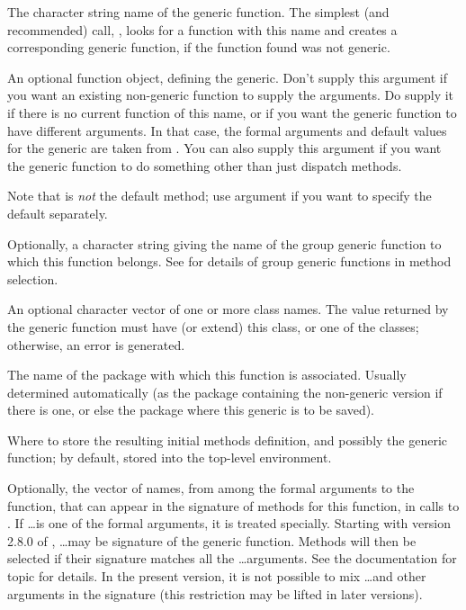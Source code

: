 \begin{Arguments}
\begin{ldescription}
\item[\code{name}]  The character string name of the generic function.
The simplest (and recommended) call, ,
looks for a function with this name and creates a corresponding
generic function,  if the function found was not generic.

\item[\code{def}]  An optional function object, defining the generic.
Don't supply this argument if you want an existing non-generic
function to supply the arguments. Do supply it if there is
no current function of this name, or if you want the generic
function to have different arguments. In that case, the formal arguments
and default values for the generic are taken from .  You
can also supply this argument if you want the generic function to
do something other than just dispatch methods.

Note that  is \emph{not} the default method; use argument
 if you want to specify the default separately.

\item[\code{group}]  Optionally, a character string giving the name of the group
generic function to which this function belongs.    See
 for details of group generic functions in method selection.

\item[\code{valueClass}]  An optional character vector of one or more class
names.  The value returned by the generic function must
have (or extend) this class, or one of the classes; otherwise,
an error is generated.

\item[\code{package}]  The name of the package with which this function is
associated.  Usually determined automatically (as the package
containing the non-generic version if there is one, or else the
package where this generic is to be saved).

\item[\code{where}]  Where to store the resulting initial methods definition,
and possibly the generic function; by
default, stored into the top-level environment.

\item[\code{signature}] 
Optionally, the vector of names, from among the formal arguments
to the  function, that can
appear in the signature of methods for this function, in calls to
. If \dots is one of the
formal arguments, it is treated specially. Starting with version
2.8.0 of \R{}, \dots may be signature of the generic function.
Methods will then be selected if their signature matches all the
\dots arguments.  See the documentation for topic
 for details.  In the present version, it is not
possible to mix \dots and other arguments in the signature (this
restriction may be lifted in later versions).


\end{ldescription}
\end{Arguments}
